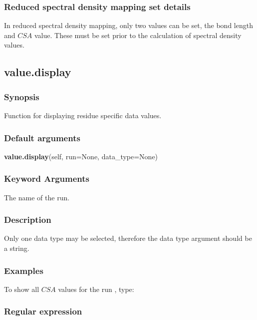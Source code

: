 \subsubsection{Reduced spectral density mapping set details}

In reduced spectral density mapping, only two values can be set, the bond length and $CSA$
value.  These must be set prior to the calculation of spectral density values.


\newpage

\subsection{value.display}


\subsubsection{Synopsis}

Function for displaying residue specific data values.

\subsubsection{Default arguments}

\textsf{\textbf{value.display}(self, run=None, data\_type=None)}


\subsubsection{Keyword Arguments}

  The name of the run.


\subsubsection{Description}

Only one data type may be selected, therefore the data type argument should be a string.


\subsubsection{Examples}

To show all $CSA$ values for the run 
, type:






\subsubsection{Regular expression}

